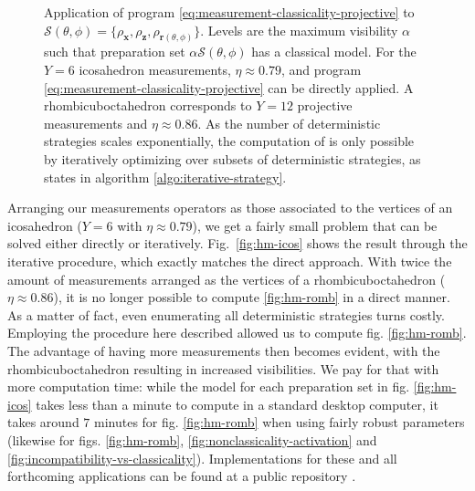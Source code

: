 \begin{figure*}[ht!]
        \centering
        \caption{Application of program \eqref{eq:measurement-classicality-projective} to $\mathcal{S}(\theta, \phi) = \{ \rho_{\mathbf{x}}, \rho_{\mathbf{z}}, \rho_{\mathbf{r}(\theta, \phi)} \}$. Levels are the maximum visibility $\alpha$ such that preparation set $\alpha \mathcal{S}(\theta, \phi)$ has a classical model.  For the $Y = 6$ icosahedron measurements, $\eta \approx 0.79$, and program \eqref{eq:measurement-classicality-projective} can be directly applied.  A rhombicuboctahedron corresponds to $Y = 12$ projective measurements and $\eta \approx 0.86$. As the number of deterministic strategies scales exponentially, the computation of  is only possible by iteratively optimizing over subsets of deterministic strategies, as states in algorithm \ref{algo:iterative-strategy}.}
    \end{figure*}
%
	Arranging our measurements operators as those associated to the vertices of an icosahedron ($Y = 6$ with $\eta \approx 0.79$), we get a fairly small problem that can be solved either directly or iteratively. Fig.~\ref{fig:hm-icos} shows the result through the iterative procedure, which exactly matches the direct approach. With twice the amount of measurements arranged as the vertices of a rhombicuboctahedron ($\eta \approx 0.86$), it is no longer possible to compute \ref{fig:hm-romb} in a direct manner. As a matter of fact, even enumerating all deterministic strategies turns costly. Employing the procedure here described allowed us to compute fig. \ref{fig:hm-romb}. The advantage of having more measurements then becomes evident, with the rhombicuboctahedron resulting in increased visibilities. We pay for that with more computation time: while the model for each preparation set in fig. \ref{fig:hm-icos} takes less than a minute to compute in a standard desktop computer, it takes around $7$ minutes for fig. \ref{fig:hm-romb} when using fairly robust parameters (likewise for figs. \ref{fig:hm-romb}, \ref{fig:nonclassicality-activation} and \ref{fig:incompatibility-vs-classicality}). Implementations for these and all forthcoming applications can be found at a public repository \cite{classicality_repository}.

